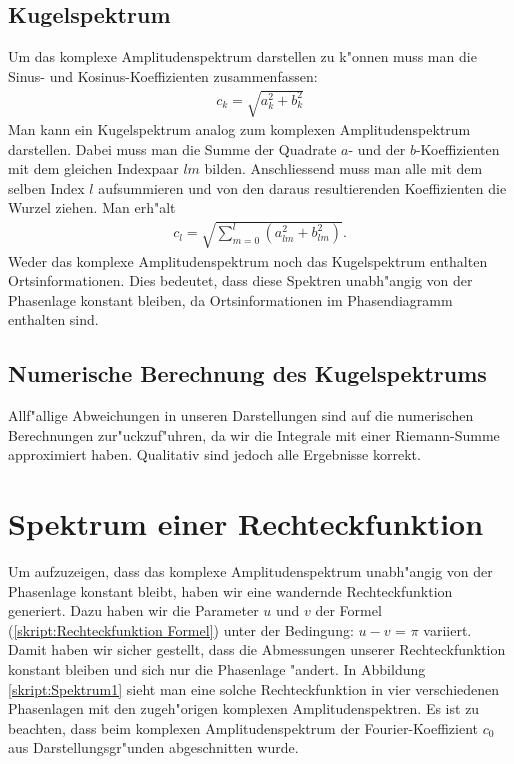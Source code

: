 \begin{refsection}
\subsection{Kugelspektrum}
Um das komplexe Amplitudenspektrum darstellen zu k"onnen muss man die
Sinus- und Kosinus-Koeffizienten zusammenfassen:
\begin{align*}
c_k= \sqrt{a^2_{k}+b^2_{k}}
\end{align*}
Man kann ein Kugelspektrum analog zum komplexen Amplitudenspektrum 
darstellen. 
Dabei muss man die Summe der Quadrate $a$- und der $b$-Koeffizienten mit 
dem gleichen Indexpaar $lm$ bilden. Anschliessend muss man alle 
mit dem selben Index $l$ aufsummieren und von den daraus resultierenden 
Koeffizienten die Wurzel ziehen. Man erh"alt 
\begin{align*}
c_l= \sqrt{\sum_{m=0}^l (a^2_{lm}+b^2_{lm})} .
\end{align*}
Weder das komplexe Amplitudenspektrum noch das Kugelspektrum enthalten 
Ortsinformationen. 
Dies bedeutet, dass diese Spektren unabh"angig von der
Phasenlage konstant bleiben, da Ortsinformationen im 
Phasendiagramm enthalten sind.

\subsection{Numerische Berechnung des Kugelspektrums}
Allf"allige Abweichungen in unseren Darstellungen sind auf die 
numerischen Berechnungen zur"uckzuf"uhren, da wir die Integrale  
mit einer Riemann-Summe approximiert haben.
Qualitativ sind jedoch alle Ergebnisse korrekt. 

\section{Spektrum einer Rechteckfunktion}


Um aufzuzeigen, dass das komplexe Amplitudenspektrum unabh"angig von 
der Phasenlage konstant bleibt, haben wir eine wandernde 
Rechteckfunktion generiert. 
Dazu haben wir die Parameter $u$ und $v$ der Formel 
(\ref{skript:Rechteckfunktion Formel})
unter der Bedingung: $u - v$ = $\pi$ variiert.
Damit haben wir sicher gestellt, dass die Abmessungen unserer 
Rechteckfunktion konstant bleiben und sich nur die Phasenlage "andert.
In Abbildung \ref{skript:Spektrum1} sieht man eine solche 
Rechteckfunktion in vier verschiedenen Phasenlagen mit den zugeh"origen 
komplexen Amplitudenspektren. 
Es ist zu beachten, dass beim komplexen Amplitudenspektrum der 
Fourier-Koeffizient $c_0$ aus Darstellungsgr"unden abgeschnitten wurde.


\end{refsection}
